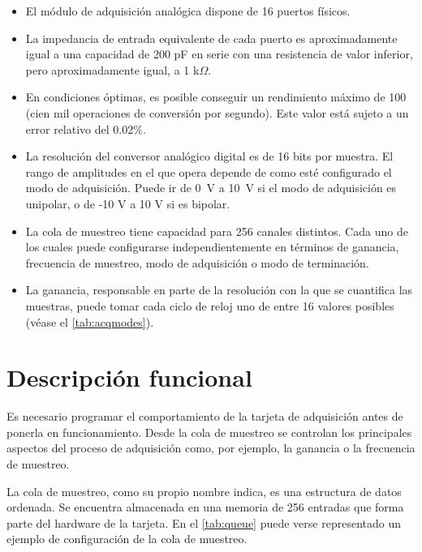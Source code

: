 \begin{itemize}
    \item El módulo de adquisición analógica dispone de 16 puertos físicos.
    \item La impedancia de entrada equivalente de cada puerto es
	aproximadamente igual a una capacidad de 200 pF en serie con una
	resistencia de valor inferior, pero aproximadamente igual, a 1
	k$\Omega$.
    \item En condiciones óptimas, es posible conseguir un rendimiento
	máximo de 100 \kms{} (cien mil operaciones de conversión por
	segundo). Este valor está sujeto a un error relativo del $0.02\%$.
    \item La resolución del conversor analógico digital es de 16 bits por
	muestra. El rango de amplitudes en el que opera depende de como
	esté configurado el modo de adquisición. Puede ir de \mbox{0 V} a
	\mbox{10 V} si el modo de adquisición es unipolar, o de -10 V a 10
	V si es bipolar.
    \item La cola de muestreo tiene capacidad para 256 canales distintos.
	Cada uno de los cuales puede configurarse independientemente en
	términos de ganancia, frecuencia de muestreo, modo de adquisición o
	modo de terminación.
    \item La ganancia, responsable en parte de la resolución con la que se
	cuantifica las muestras, puede tomar cada ciclo de reloj uno de
	entre 16 valores posibles (véase el \vref{tab:acqmodes}).
\end{itemize}


\section{Descripción funcional}\label{sec:funcdesc}

Es necesario programar el comportamiento de la tarjeta de adquisición antes
de ponerla en funcionamiento. Desde la cola de muestreo se controlan los
principales aspectos del proceso de adquisición como, por ejemplo, la
ganancia o la frecuencia de muestreo.

La cola de muestreo, como su propio nombre indica, es una estructura de
datos ordenada. Se encuentra almacenada en una memoria  de 256
entradas que forma parte del hardware de la tarjeta. En el \cref{tab:queue}
puede verse representado un ejemplo de configuración de la cola de
muestreo.

